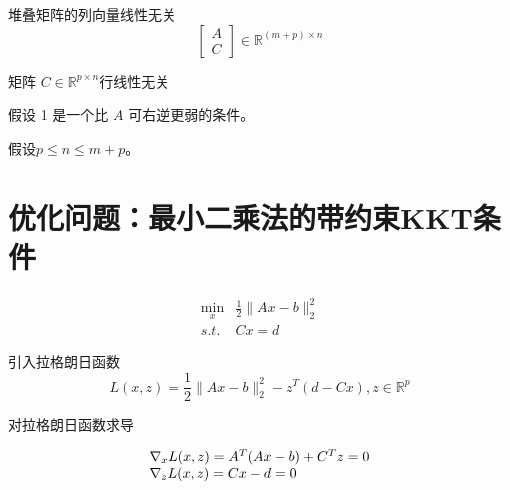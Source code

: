 \begin{proposition}
    \label{prop:assumption-1}

    堆叠矩阵的列向量线性无关
$$
\left[\begin{array}{l}
A \\
C
\end{array}\right] \in \mathbb{R}^{(m+p) \times n}
$$
\end{proposition}

\begin{proposition}
    \label{prop:assumption-2}
    矩阵 $ C \in \mathbb{R}^{p \times n} $行线性无关

\end{proposition}

假设 1 是一个比 $ A $ 可右逆更弱的条件。 

假设$ p \leq n \leq m+p $。

\section{优化问题：最小二乘法的带约束KKT条件}

\begin{problem}
    $$\begin{aligned}
        \min _{x} & \frac{1}{2}\|A x-b\|_{2}^{2}\\
        s.t. & C x=d
    \end{aligned}$$
\end{problem}


引入拉格朗日函数
$$
L(x, z)=\frac{1}{2}\|A x-b\|_{2}^{2}-z^{T}(d-C x), z \in \mathbb{R}^{p}
$$

对拉格朗日函数求导


\begin{equation}
    \centering
    \label{eqn:kkt-deriavative}
    \begin{array}{l}
\nabla_{x} L(x, z)=A^{T}(A x-b)+C^{T} z=0 \\
\nabla_{z} L(x, z)=C x-d=0
\end{array}
\end{equation}



